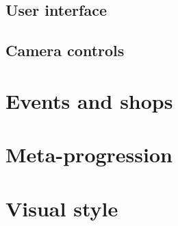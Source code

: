 \subsection{User interface}

\subsection{Camera controls}

\section{Events and shops}

\section{Meta-progression}

\section{Visual style}